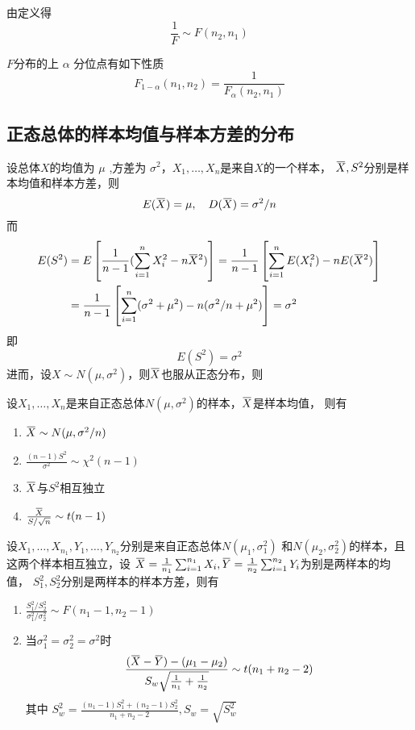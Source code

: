 \documentclass[11pt]{article}
\begin{document}
由定义得
\begin{equation*}
\frac{1}{F}\sim F(n_2,n_1)
\end{equation*}


\(F\)分布的上 \(\alpha\) 分位点有如下性质
\begin{equation*}
F_{1-\alpha}(n_1,n_2)=\frac{1}{F_\alpha(n_2,n_1)}
\end{equation*}

\subsection{正态总体的样本均值与样本方差的分布}
\label{sec:org527e047}
设总体\(X\)的均值为 \(\mu\) ,方差为 \(\sigma^2\)，\(X_1,\dots,X_n\)是来自\(X\)的一个样本，
\(\bbar{X},S^2\)分别是样本均值和样本方差，则
\begin{equation*}
E(\bbar{X})=\mu,\quad D(\bbar{X})=\sigma^2/n
\end{equation*}
而
\begin{align*}
E(S^2)&=E\left[\frac{1}{n-1}(\sum_{i=1}^nX_i^2-n\bbar{X}^2)
\right]=\frac{1}{n-1}\left[\sum_{i=1}^nE(X_i^2)-nE(\bbar{X}^2)
\right]\\
&=\frac{1}{n-1}\left[\sum_{i=1}^n(\sigma^2+\mu^2)-n(\sigma^2/n+\mu^2)
\right]=\sigma^2
\end{align*}
即
\begin{equation*}
E(S^2)=\sigma^2
\end{equation*}
进而，设\(X\sim N(\mu,\sigma^2)\)，则\(\bbar{X}\)也服从正态分布，则
\begin{theorem}[]
\label{thm6.3.3}
设\(X_1,\dots,X_n\)是来自正态总体\(N(\mu,\sigma^2)\)的样本，\(\bbar{X}\)是样本均值，
则有
\begin{enumerate}
\item \(\bbar{X}\sim N(\mu,\sigma^2/n)\)
\item \(\frac{(n-1)S^2}{\sigma^2}\sim\chi^2(n-1)\)
\item \(\bbar{X}\)与\(S^2\)相互独立
\item \(\frac{\bbar{X}}{S/\sqrt{n}}\sim t(n-1)\)
\end{enumerate}
\end{theorem}

\begin{theorem}[]
\label{thm6.3.4}
设\(X_1,\dots,X_{n_1},Y_1,\dots,Y_{n_2}\)分别是来自正态总体\(N(\mu_1,\sigma^2_1)\)
和\(N(\mu_2,\sigma_2^2)\)的样本，且这两个样本相互独立，设
\(\bbar{X}=\frac{1}{n_1}\sum_{i=1}^{n_1}X_i,
   \bbar{Y}=\frac{1}{n_2}\sum_{i=1}^{n_2}Y_i\)为别是两样本的均值，
\(S_1^2,S_2^2\)分别是两样本的样本方差，则有
\begin{enumerate}
\item \(\frac{S_1^2/S_2^2}{\sigma_1^2/\sigma_2^2}\sim F(n_1-1,n_2-1)\)
\item 当\(\sigma_1^2=\sigma_2^2=\sigma^2\)时
\begin{equation*}
\frac{(\bbar{X}-\bbar{Y})-(\mu_1-\mu_2)}{S_w\sqrt{\frac{1}{n_1}+\frac{1}{n_2}}}\sim
t(n_1+n_2-2)
\end{equation*}
其中 \(S_w^2=\frac{(n_1-1)S_1^2+(n_2-1)S_2^2}{n_1+n_2-2},S_w=\sqrt{S_w^2}\)
\end{enumerate}
\end{theorem}
\end{document}
